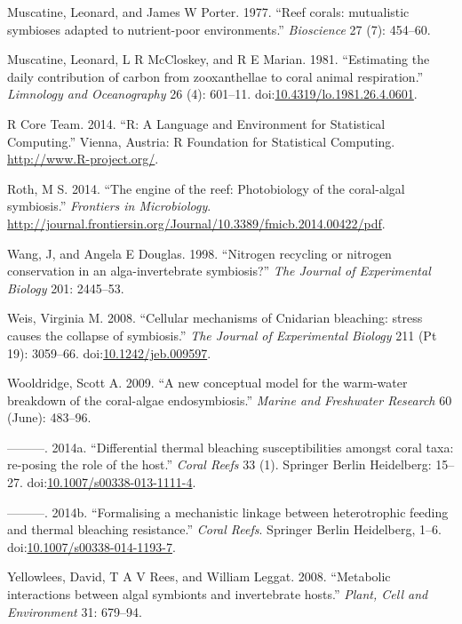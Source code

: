 \documentclass[]{elsarticle} %
\begin{document}
\hypertarget{ref-Muscatine:1977p4220}{}
Muscatine, Leonard, and James W Porter. 1977. ``Reef corals: mutualistic
symbioses adapted to nutrient-poor environments.'' \emph{Bioscience} 27
(7): 454--60.

\hypertarget{ref-Muscatine:1981jy}{}
Muscatine, Leonard, L R McCloskey, and R E Marian. 1981. ``Estimating
the daily contribution of carbon from zooxanthellae to coral animal
respiration.'' \emph{Limnology and Oceanography} 26 (4): 601--11.
doi:\href{https://doi.org/10.4319/lo.1981.26.4.0601}{10.4319/lo.1981.26.4.0601}.

\hypertarget{ref-RALanguageandEn:2014wf}{}
R Core Team. 2014. ``R: A Language and Environment for Statistical
Computing.'' Vienna, Austria: R Foundation for Statistical Computing.
\url{http://www.R-project.org/}.

\hypertarget{ref-Roth:2014wf}{}
Roth, M S. 2014. ``The engine of the reef: Photobiology of the
coral-algal symbiosis.'' \emph{Frontiers in Microbiology}.
\url{http://journal.frontiersin.org/Journal/10.3389/fmicb.2014.00422/pdf}.

\hypertarget{ref-Wang:1998p128}{}
Wang, J, and Angela E Douglas. 1998. ``Nitrogen recycling or nitrogen
conservation in an alga-invertebrate symbiosis?'' \emph{The Journal of
Experimental Biology} 201: 2445--53.

\hypertarget{ref-Weis:2008p944}{}
Weis, Virginia M. 2008. ``Cellular mechanisms of Cnidarian bleaching:
stress causes the collapse of symbiosis.'' \emph{The Journal of
Experimental Biology} 211 (Pt 19): 3059--66.
doi:\href{https://doi.org/10.1242/jeb.009597}{10.1242/jeb.009597}.

\hypertarget{ref-Wooldridge:2009p7807}{}
Wooldridge, Scott A. 2009. ``A new conceptual model for the warm-water
breakdown of the coral-algae endosymbiosis.'' \emph{Marine and
Freshwater Research} 60 (June): 483--96.

\hypertarget{ref-Wooldridge:2014di}{}
---------. 2014a. ``Differential thermal bleaching susceptibilities
amongst coral taxa: re-posing the role of the host.'' \emph{Coral Reefs}
33 (1). Springer Berlin Heidelberg: 15--27.
doi:\href{https://doi.org/10.1007/s00338-013-1111-4}{10.1007/s00338-013-1111-4}.

\hypertarget{ref-Wooldridge:2014hc}{}
---------. 2014b. ``Formalising a mechanistic linkage between
heterotrophic feeding and thermal bleaching resistance.'' \emph{Coral
Reefs}. Springer Berlin Heidelberg, 1--6.
doi:\href{https://doi.org/10.1007/s00338-014-1193-7}{10.1007/s00338-014-1193-7}.

\hypertarget{ref-Yellowlees:2008p331}{}
Yellowlees, David, T A V Rees, and William Leggat. 2008. ``Metabolic
interactions between algal symbionts and invertebrate hosts.''
\emph{Plant, Cell and Environment} 31: 679--94.
\end{document}
